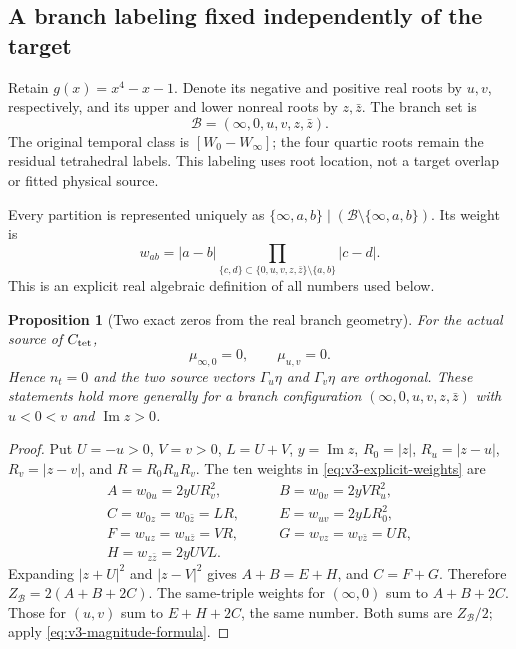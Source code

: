 \documentclass[11pt]{article}
\newtheorem{proposition}[proposition]{Proposition}
\theoremstyle{definition}
\theoremstyle{remark}
\begin{document}
\subsection{A branch labeling fixed independently of the target}
Retain $g(x)=x^4-x-1$. Denote its negative and positive real roots by
$u,v$, respectively, and its upper and lower nonreal roots by $z,\bar z$.
The branch set is
\begin{equation}
 \mathcal B=(\infty,0,u,v,z,\bar z).
 \label{eq:v3-branch-label}
\end{equation}
The original temporal class is $[W_0-W_\infty]$; the four quartic roots
remain the residual tetrahedral labels. This labeling uses root location,
not a target overlap or fitted physical source.

Every partition is represented uniquely as $\{\infty,a,b\}\mid
(\mathcal B\setminus\{\infty,a,b\})$. Its weight is
\begin{equation}
 w_{ab}=|a-b|\prod_{\{c,d\}\subset\{0,u,v,z,\bar z\}\setminus\{a,b\}}
                   |c-d|.
 \label{eq:v3-explicit-weights}
\end{equation}
This is an explicit real algebraic definition of all numbers used below.

\begin{proposition}[Two exact zeros from the real branch geometry]
\label{prop:v3-zero}
For the actual source of $C_{\rm tet}$,
\begin{equation}
 \boxed{\mu_{\infty,0}=0,\qquad \mu_{u,v}=0.}
 \label{eq:v3-zero}
\end{equation}
Hence $n_t=0$ and the two source vectors $\Gamma_u\eta$ and
$\Gamma_v\eta$ are orthogonal. These statements hold more generally for a
branch configuration $(\infty,0,u,v,z,\bar z)$ with $u<0<v$ and
$\operatorname{Im}z>0$.
\end{proposition}
\begin{proof}
Put $U=-u>0$, $V=v>0$, $L=U+V$, $y=\operatorname{Im}z$,
$R_0=|z|$, $R_u=|z-u|$, $R_v=|z-v|$, and $R=R_0R_uR_v$.
The ten weights in \eqref{eq:v3-explicit-weights} are
\begin{align*}
 A=w_{0u}=2yUR_v^2,&\qquad B=w_{0v}=2yVR_u^2,\\
 C=w_{0z}=w_{0\bar z}=LR,&\qquad E=w_{uv}=2yLR_0^2,\\
 F=w_{uz}=w_{u\bar z}=VR,&\qquad
 G=w_{vz}=w_{v\bar z}=UR,\\
 H=w_{z\bar z}=2yUVL.&
\end{align*}
Expanding $|z+U|^2$ and $|z-V|^2$ gives
$A+B=E+H$, and $C=F+G$. Therefore
$Z_{\mathcal B}=2(A+B+2C)$.
The same-triple weights for $(\infty,0)$ sum to $A+B+2C$.
Those for $(u,v)$ sum to $E+H+2C$, the same number.
Both sums are $Z_{\mathcal B}/2$; apply
\eqref{eq:v3-magnitude-formula}.
\end{proof}
\end{document}
